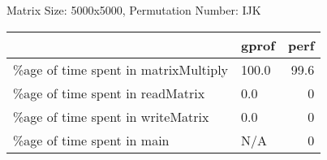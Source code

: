 \documentclass{article}
\begin{document}
    Matrix Size: 5000x5000, Permutation Number: IJK \\
    \begin{tabular}{llr}
\hline
                                      & gprof   &   perf \\
\hline
 \%age of time spent in matrixMultiply & 100.0   &   99.6 \\
 \%age of time spent in readMatrix     & 0.0     &    0   \\
 \%age of time spent in writeMatrix    & 0.0     &    0   \\
 \%age of time spent in main           & N/A     &    0   \\
\hline
\end{tabular}
    
\end{document}
